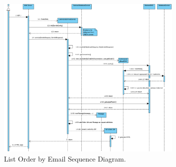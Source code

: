 \begin{figure}[h]
    \centering
    \includegraphics[width=0.8\textwidth]{mockup/ListOrderByEmailSequenceDiagram}
    \caption{List Order by Email Sequence Diagram.}
    \label{fig:listorder}
\end{figure}

\newpage